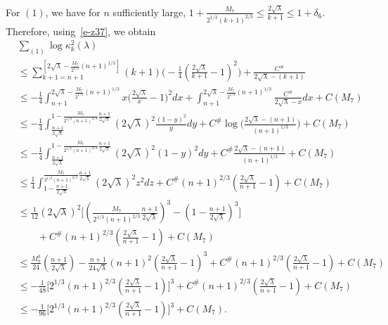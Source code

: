 \documentclass{amsart}
\theoremstyle{definition}
\theoremstyle{remark}
\numberwithin{equation}{section}
\begin{document}
\medskip
For $(1)$, we have for $n$ sufficiently large,  
$1+\frac{M_7}{2^{1/3}(k+1)^{2/3}} \leq \frac{2\sqrt\lambda}{k+1} \leq 1+\delta_6$.
Therefore, using~\eqref{e-z37}, we obtain 
\begin{equation}\label{e-z41}
\begin{split}
  &\sum_{(1)} \log{\kappa^2_{k}(\lambda)}\\
  &\le \sum_{k+1=n+1}^{[2\sqrt\lambda -\frac{M_7}{2^{1/3}}(n+1)^{1/3}]}
        (k+1) \biggl( -\frac14(\frac{2\sqrt\lambda}{k+1}-1)^2\biggr) 
      +\frac{C^{\#}}{2\sqrt{\lambda}-(k+1)}\\
  &\leq -\frac14\int_{n+1}^{2\sqrt\lambda -\frac{M_7}{2^{1/3}}(n+1)^{1/3}}
       x\bigl(\frac{2\sqrt\lambda}{x}-1\bigr)^2 dx
       + \int_{n+1}^{2\sqrt\lambda -\frac{M_7}{2^{1/3}}(n+1)^{1/3}}
       \frac{C^{\#}}{2\sqrt{\lambda}-x}dx +C(M_7)\\
  &\leq -\frac14\int_{\frac{n+1}{2\sqrt\lambda}}
   ^{1-\frac{M_7}{2^{1/3}(n+1)^{2/3}}\frac{n+1}{2\sqrt\lambda}}
    (2\sqrt\lambda)^2 \frac{(1-y)^2}{y} dy
    + C^{\#}\log\biggl(\frac{2\sqrt{\lambda}-(n+1)}{(n+1)^{1/3}} \biggr)
    +C(M_7)\\
  &\leq -\frac14\int_{\frac{n+1}{2\sqrt\lambda}}
   ^{1-\frac{M_7}{2^{1/3}(n+1)^{2/3}}\frac{n+1}{2\sqrt\lambda}}
    (2\sqrt\lambda)^2 (1-y)^2 dy
    + C^{\#}\frac{2\sqrt{\lambda}-(n+1)}{(n+1)^{1/3}} 
    +C(M_7)\\
  &\leq \frac14\int_{1-\frac{n+1}{2\sqrt\lambda}}
   ^{\frac{M_7}{2^{1/3}(n+1)^{2/3}}\frac{n+1}{2\sqrt\lambda}}
    (2\sqrt\lambda)^2 z^2 dz
    + C^{\#}(n+1)^{2/3}(\frac{2\sqrt\lambda}{n+1}-1)
    +C(M_7)\\
  &\leq \frac1{12}(2\sqrt\lambda)^2
    \biggl[( \frac{M_7}{2^{1/3}(n+1)^{2/3}}\frac{n+1}{2\sqrt\lambda})^3
    - (1-\frac{n+1}{2\sqrt\lambda})^3 \biggr]\\
  & \qquad + C^{\#}(n+1)^{2/3}(\frac{2\sqrt\lambda}{n+1}-1)
    +C(M_7)\\
  &\leq \frac{M_7^3}{24}(\frac{n+1}{2\sqrt\lambda}) 
    -\frac{n+1}{24\sqrt\lambda}(n+1)^2(\frac{2\sqrt\lambda}{n+1}-1)^3 
    + C^{\#}(n+1)^{2/3}(\frac{2\sqrt\lambda}{n+1}-1)
    +C(M_7)\\
  &\leq - \frac1{48}\biggl[2^{1/3}(n+1)^{2/3}
    (\frac{2\sqrt\lambda}{n+1}-1)\biggr]^3 
    + C^{\#}(n+1)^{2/3}(\frac{2\sqrt\lambda}{n+1}-1)
    +C(M_7)\\
  &\le - \frac1{96}\biggl[2^{1/3}(n+1)^{2/3}
    (\frac{2\sqrt\lambda}{n+1}-1)\biggr]^3 +C(M_7).
\end{split}
\end{equation}
\end{document}
